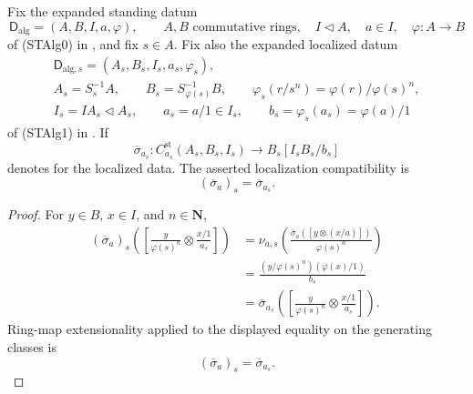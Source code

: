 \begin{lemma}
  \label{lemma:nagata-strict-transform-chart-localization}
  \lean{}

  Fix the expanded standing datum
  \[
    \mathsf D_{\mathrm{alg}}=(A,B,I,a,\varphi),\qquad
    A,B\text{ commutative rings},\quad
    I\triangleleft A,\quad a\in I,\quad
    \varphi\colon A\to B
  \]
  of (STAlg0) in
  , and fix $s\in A$.
  Fix also the expanded localized datum
  \[
  \begin{gathered}
    \mathsf D_{\mathrm{alg},s}
      =(A_s,B_s,I_s,a_s,\varphi_s),\\
    A_s=S_s^{-1}A,\qquad
    B_s=S_{\varphi(s)}^{-1}B,\qquad
    \varphi_s(r/s^n)=\varphi(r)/\varphi(s)^n,\\
    I_s=IA_s\triangleleft A_s,\qquad
    a_s=a/1\in I_s,\qquad
    b_s=\varphi_s(a_s)=\varphi(a)/1
  \end{gathered}
  \]
  of (STAlg1) in
  .
  If
  \[
    \overline\sigma_{a_s}\colon
      C_{a_s}^{\mathrm{st}}(A_s,B_s,I_s)
      \to B_s[I_sB_s/b_s]
  \]
  denotes  for the
  localized data.  The asserted localization compatibility is
  \[
    (\overline\sigma_a)_s=\overline\sigma_{a_s}.
  \]
\end{lemma}

\begin{proof}
  For $y\in B$, $x\in I$, and $n\in\mathbf N$,
  \[
  \begin{aligned}
    (\overline\sigma_a)_s\left(
      \left[\frac y{\varphi(s)^n}\otimes\frac{x/1}{a_s}\right]\right)
      &=\nu_{a,s}\left(
        \frac{\overline\sigma_a([y\otimes(x/a)])}{\varphi(s)^n}\right)\\
      &=\frac{(y/\varphi(s)^n)(\varphi(x)/1)}{b_s}\\
      &=\overline\sigma_{a_s}\left(
        \left[\frac y{\varphi(s)^n}\otimes\frac{x/1}{a_s}\right]\right).
  \end{aligned}
  \]
  Ring-map extensionality applied to the displayed equality on the generating
  classes is
  \[
    (\overline\sigma_a)_s=\overline\sigma_{a_s}.
  \]
\end{proof}

